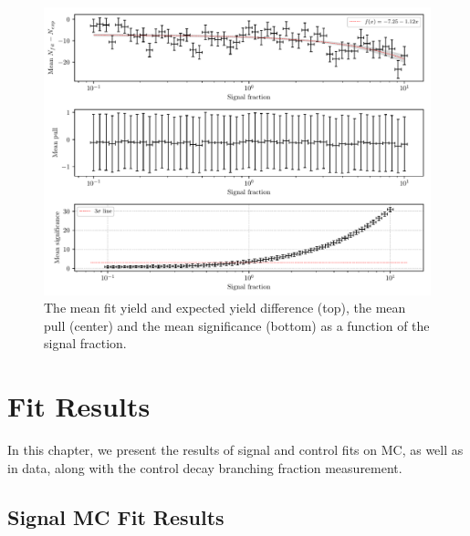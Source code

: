 \begin{figure}[H]
	\centering
	\captionsetup{width=0.8\linewidth}
	\includegraphics[width=\linewidth]{fig/lin_test}
	\caption{The mean fit yield and expected yield difference (top), the mean pull (center) and the mean significance (bottom) as a function of the signal fraction.}
	\label{fig:lin_test}
\end{figure}


\chapter{Fit Results}
\label{sec:fit-results}
In this chapter, we present the results of signal and control fits on MC, as well as in data, along with the control decay branching fraction measurement.

\section{Signal MC Fit Results}\label{sec:signal-mc-fit-results}

